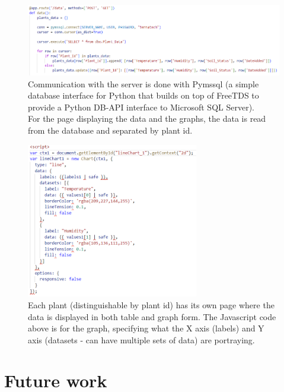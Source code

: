 \documentclass[12pt]{article}
\begin{document}
\begin{figure}[ht]
    \centering
    \includegraphics[width=1\textwidth]{images/image2.png}
    \caption{Communication with the server is done with Pymssql (a simple database interface for Python that builds on top of FreeTDS to provide a Python DB-API interface to Microsoft SQL Server). \\
    For the page displaying the data and the graphs, the data is read from the database and separated by plant id. }
    \label{fig:pic4}
\end{figure} 

\begin{figure}[ht]
    \centering
    \includegraphics[width=0.67\textwidth]{images/image6.png}
    \caption{Each plant (distinguishable by plant id) has its own page where the data is displayed in both table and graph form. The Javascript code above is for the graph, specifying what the X axis (labels) and Y axis (datasets - can have multiple sets of data) are portraying. }
    \label{fig:pic4}
\end{figure} 

\newpage

\section{Future work}
\end{document}
